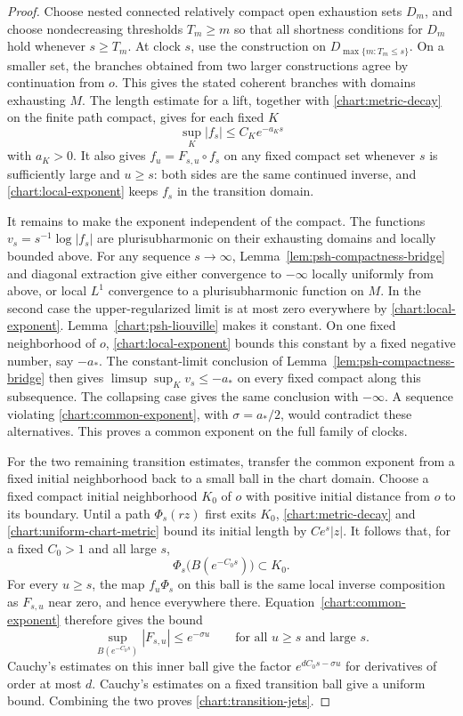 \documentclass[11pt]{article}
\theoremstyle{definition}
\theoremstyle{remark}
\numberwithin{equation}{section}
\begin{document}
\begin{proof}
Choose nested connected relatively compact open exhaustion
sets $D_m$, and choose nondecreasing thresholds $T_m\ge m$
so that all shortness conditions for $D_m$ hold whenever
$s\ge T_m$.  At clock $s$, use the construction on
$D_{\max\{m:T_m\le s\}}$.  On a smaller set, the branches
obtained from two larger constructions agree by continuation
from $o$.  This gives the stated coherent branches with
domains exhausting $M$.  The length estimate for a lift,
together with \eqref{chart:metric-decay} on the finite path
compact, gives for each fixed $K$
\begin{equation}\label{chart:local-exponent}
 \sup_K|f_s|\le C_Ke^{-a_Ks}
\end{equation}
with $a_K>0$.  It also gives
$f_u=F_{s,u}\circ f_s$ on any fixed compact set whenever
$s$ is sufficiently large and $u\ge s$: both sides are
the same continued inverse, and
\eqref{chart:local-exponent} keeps $f_s$ in the transition
domain.

It remains to make the exponent independent of the compact.
The functions $v_s=s^{-1}\log|f_s|$ are plurisubharmonic on
their exhausting domains and locally bounded above.
For any sequence $s\to\infty$,
Lemma~\ref{lem:psh-compactness-bridge} and diagonal extraction
give either convergence to
$-\infty$ locally uniformly from above, or local $L^1$
convergence to a plurisubharmonic function on $M$.
In the second case the upper-regularized limit is at most
zero everywhere by \eqref{chart:local-exponent}.
Lemma~\ref{chart:psh-liouville} makes it constant.  On one
fixed neighborhood of $o$, \eqref{chart:local-exponent}
bounds this constant by a fixed negative number, say
$-a_*$.  The constant-limit conclusion of
Lemma~\ref{lem:psh-compactness-bridge} then gives
$\limsup\sup_Kv_s\le-a_*$ on every fixed compact along
this subsequence.  The collapsing case gives the same
conclusion with $-\infty$.  A sequence violating
\eqref{chart:common-exponent}, with $\sigma=a_*/2$, would
contradict these alternatives.  This proves a common
exponent on the full family of clocks.

For the two remaining transition estimates, transfer the common
exponent from a fixed initial neighborhood back to a small ball in
the chart domain.  Choose a fixed compact initial neighborhood $K_0$
of $o$ with positive initial distance from $o$ to its
boundary.  Until a path $\Phi_s(rz)$ first exits $K_0$,
\eqref{chart:metric-decay} and
\eqref{chart:uniform-chart-metric} bound its initial length
by $Ce^s|z|$.  It follows that, for a fixed $C_0>1$ and
all large $s$,
\[
 \Phi_s\bigl(B(e^{-C_0s})\bigr)\subset K_0.
\]
For every $u\ge s$, the map $f_u\Phi_s$ on this ball is
the same local inverse composition as $F_{s,u}$ near zero,
and hence everywhere there.  Equation~\eqref{chart:common-exponent}
therefore gives the bound
\begin{equation}\label{chart:transition-inner-bound}
 \sup_{B(e^{-C_0s})}|F_{s,u}|\le e^{-\sigma u}
 \qquad\text{for all }u\ge s\text{ and large }s.
\end{equation}
Cauchy's estimates on this inner ball give the factor
$e^{dC_0s-\sigma u}$ for derivatives of order at most $d$.
Cauchy's estimates on a fixed transition ball give a uniform
bound.  Combining the two proves
\eqref{chart:transition-jets}.


\end{proof}
\end{document}
